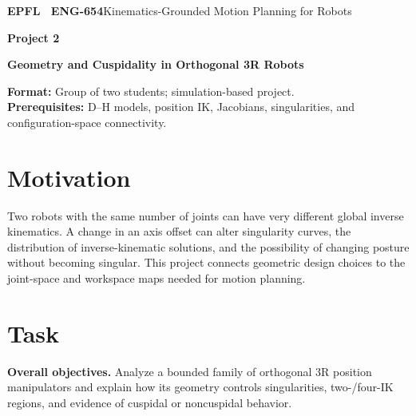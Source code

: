 \documentclass[11pt,a4paper]{article}
\begin{document}
{\small\textbf{EPFL \textbar\ ENG-654}\hfill Kinematics-Grounded Motion Planning for Robots}
\vspace{5mm}

{\color{epflred}\Large\bfseries Project 2}

{\LARGE\bfseries Geometry and Cuspidality in Orthogonal 3R Robots\par}

\textbf{Format:} Group of two students; simulation-based project.\\
\textbf{Prerequisites:} D--H models, position IK, Jacobians,
singularities, and configuration-space connectivity.

\section*{Motivation}
Two robots with the same number of joints can have very different global
inverse kinematics. A change in an axis offset can alter singularity curves,
the distribution of inverse-kinematic solutions, and the possibility of changing
posture without becoming singular. This project connects geometric design
choices to the joint-space and workspace maps needed for motion planning.

\section*{Task}
\textbf{Overall objectives.} Analyze a bounded family of orthogonal 3R position manipulators and explain
how its geometry controls singularities, two-/four-IK regions, and evidence of
cuspidal or noncuspidal behavior.
\end{document}
